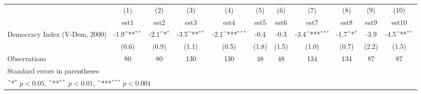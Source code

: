 {
\def\sym#1{\ifmmode^{#1}\else\(^{#1}\)\fi}
\begin{tabular}{l*{10}{c}}
\hline\hline
                    &\multicolumn{1}{c}{(1)}         &\multicolumn{1}{c}{(2)}         &\multicolumn{1}{c}{(3)}         &\multicolumn{1}{c}{(4)}         &\multicolumn{1}{c}{(5)}         &\multicolumn{1}{c}{(6)}         &\multicolumn{1}{c}{(7)}         &\multicolumn{1}{c}{(8)}         &\multicolumn{1}{c}{(9)}         &\multicolumn{1}{c}{(10)}         \\
                    &        est1         &        est2         &        est3         &        est4         &        est5         &        est6         &        est7         &        est8         &        est9         &       est10         \\
\hline
Democracy Index (V-Dem, 2000)&        -1.9\sym{**} &        -2.1\sym{*}  &        -3.5\sym{**} &        -2.1\sym{***}&        -0.4         &        -0.3         &        -3.4\sym{***}&        -1.7\sym{*}  &        -3.9         &        -4.5\sym{**} \\
                    &       (0.6)         &       (0.9)         &       (1.1)         &       (0.5)         &       (1.8)         &       (1.5)         &       (1.0)         &       (0.7)         &       (2.2)         &       (1.5)         \\
\hline
Observations        &          80         &          80         &         130         &         130         &          48         &          48         &         134         &         134         &          87         &          87         \\
\hline\hline
\multicolumn{11}{l}{\footnotesize Standard errors in parentheses}\\
\multicolumn{11}{l}{\footnotesize \sym{*} \(p<0.05\), \sym{**} \(p<0.01\), \sym{***} \(p<0.001\)}\\
\end{tabular}
}
